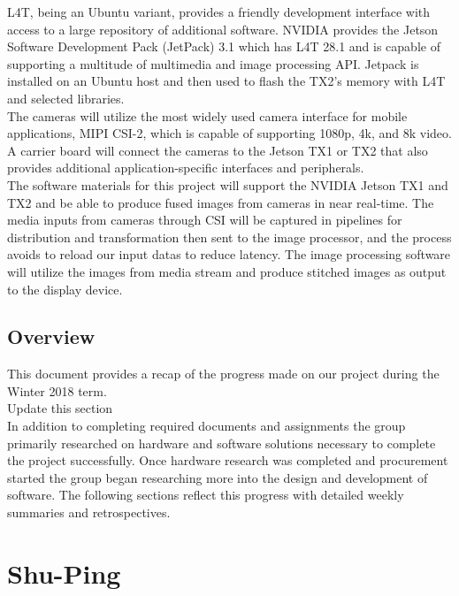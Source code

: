 \documentclass[letterpaper,10pt,serif,draftclsnofoot,onecolumn,compsoc,titlepage]{IEEEtran}
\begin{document}
L4T, being an Ubuntu variant, provides a friendly development interface with access to a 
large repository of additional software.
NVIDIA provides the Jetson Software Development Pack (JetPack) 3.1 which has L4T 28.1 
and is capable of supporting a multitude of multimedia and image processing API. Jetpack 
is installed on an Ubuntu host and then used to flash the TX2's memory with L4T and 
selected libraries. \\

The cameras will utilize the most widely used camera interface for mobile applications, 
MIPI CSI-2, which is capable of supporting 1080p, 4k, and 8k video. 
A carrier board will connect the cameras to the Jetson TX1 or TX2 that also provides 
additional application-specific interfaces and peripherals. \\

The software materials for this project will support the NVIDIA Jetson TX1 and TX2 and 
be able to produce fused images from cameras in near real-time. The media inputs from 
cameras through CSI will be captured in pipelines for distribution and transformation 
then sent to the image processor, and the process avoids to reload our input datas to 
reduce latency. The image processing software will utilize the images from media stream 
and produce stitched images as output to the display device.  \\

\subsection{Overview}
This document provides a recap of the progress made on our project during the 
Winter 2018 term. \\

Update this section \\

In addition to completing required documents and assignments the group primarily 
researched on hardware and software solutions necessary to complete the project 
successfully. Once hardware research was completed and procurement started the group 
began researching more into the design and development of software. The following 
sections reflect this progress with detailed weekly summaries and retrospectives. \\


\section{Shu-Ping}
\end{document}
